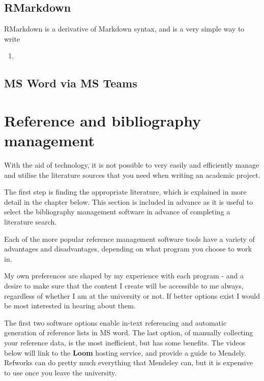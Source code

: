 \documentclass[
]{book}
\providecommand{\tightlist}{%
  \setlength{\itemsep}{0pt}\setlength{\parskip}{0pt}}
\begin{document}
\hypertarget{rmarkdown}{%
\section{RMarkdown}\label{rmarkdown}}

RMarkdown is a derivative of Markdown syntax, and is a very simple way to write

\begin{enumerate}
\def\labelenumi{\arabic{enumi}.}
\tightlist
\item
\end{enumerate}

\hypertarget{ms-word-via-ms-teams}{%
\section{MS Word via MS Teams}\label{ms-word-via-ms-teams}}

\hypertarget{reference-and-bibliography-management}{%
\chapter{Reference and bibliography management}\label{reference-and-bibliography-management}}

With the aid of technology, it is not possible to very easily and efficiently manage and utilise the literature sources that you need when writing an academic project.

The first step is finding the appropriate literature, which is explained in more detail in the chapter below. This section is included in advance as it is useful to select the bibliography management software in advance of completing a literature search.

Each of the more popular reference management software tools have a variety of advantages and disadvantages, depending on what program you choose to work in.

My own preferences are shaped by my experience with each program - and a desire to make sure that the content I create will be accessible to me always, regardless of whether I am at the university or not. If better options exist I would be most interested in hearing about them.

The first two software options enable in-text referencing and automatic generation of reference lists in MS word. The last option, of manually collecting your reference data, is the most inefficient, but has some benefits. The videos below will link to the \textbf{Loom} hosting service, and provide a guide to Mendely. Refworks can do pretty much everything that Mendeley can, but it is expensive to use once you leave the university.
\end{document}
